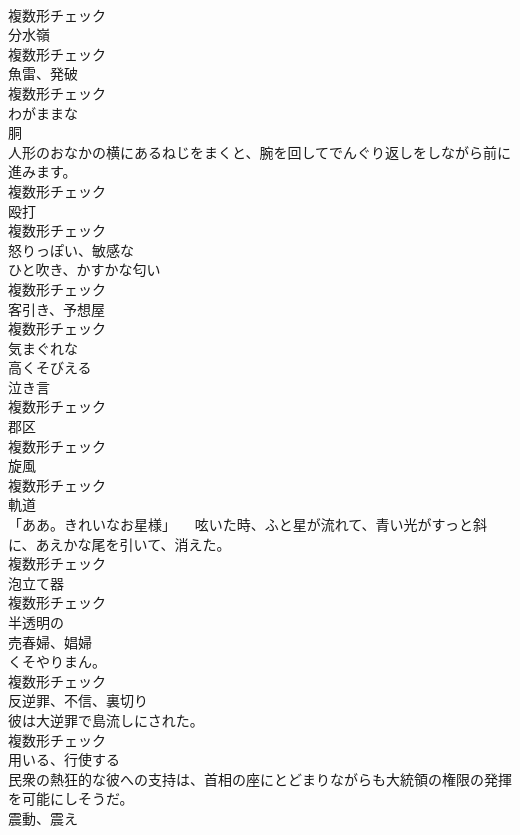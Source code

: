 \documentclass[8pt]{extreport}
\begin{document}
\begin{CJK}{UTF8}{min}
\\	複数形チェック
\\	[名詞]	分水嶺	
\\	複数形チェック
\\	[名詞]	魚雷、発破	
\\	複数形チェック
\\	[形容詞]	わがままな	
\\	[名詞]	胴	
\\	人形のおなかの横にあるねじをまくと、腕を回してでんぐり返しをしながら前に進みます。	
\\	複数形チェック
\\	[名詞]	殴打	
\\	複数形チェック
\\	[形容詞]	怒りっぽい、敏感な	
\\	[名詞]	ひと吹き、かすかな匂い	
\\	複数形チェック
\\	[名詞]	客引き、予想屋	
\\	複数形チェック
\\	[形容詞]	気まぐれな	
\\	[形容詞]	高くそびえる	
\\	[名詞]	泣き言	
\\	複数形チェック
\\	[名詞]	郡区	
\\	複数形チェック
\\	[名詞]	旋風	
\\	複数形チェック
\\	[名詞]	軌道	
\\	「ああ。きれいなお星様」 　呟いた時、ふと星が流れて、青い光がすっと斜に、あえかな尾を引いて、消えた。	
\\	複数形チェック
\\	[名詞]	泡立て器	
\\	複数形チェック
\\	[形容詞]	半透明の	
\\	[名詞]	売春婦、娼婦	
\\	くそやりまん。	
\\	複数形チェック
\\	[名詞]	反逆罪、不信、裏切り	
\\	彼は大逆罪で島流しにされた。	
\\	複数形チェック
\\	[動詞]	用いる、行使する	
\\	民衆の熱狂的な彼への支持は、首相の座にとどまりながらも大統領の権限の発揮を可能にしそうだ。	
\\	[名詞]	震動、震え	

\end{CJK}
\end{document}
